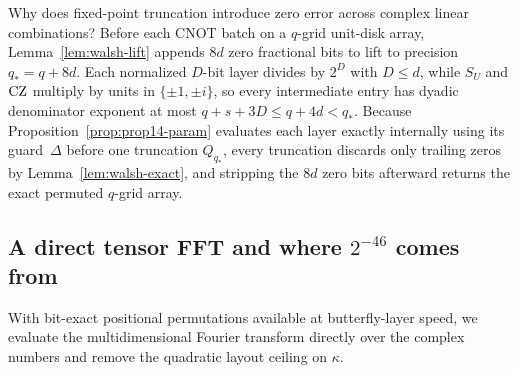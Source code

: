 Why does fixed-point truncation introduce zero error across complex linear combinations? Before each CNOT batch on a $q$-grid unit-disk array, Lemma~\ref{lem:walsh-lift} appends $8d$ zero fractional bits to lift to precision $q_*=q+8d$. Each normalized $D$-bit layer divides by $2^D$ with $D\le d$, while $S_U$ and $\mathrm{CZ}$ multiply by units in $\{\pm 1,\pm i\}$, so every intermediate entry has dyadic denominator exponent at most $q+s+3D\le q+4d < q_*$. Because Proposition~\ref{prop:prop14-param} evaluates each layer exactly internally using its guard~$\Delta$ before one truncation $Q_{q_*}$, every truncation discards only trailing zeros by Lemma~\ref{lem:walsh-exact}, and stripping the $8d$ zero bits afterward returns the exact permuted $q$-grid array.

\subsection{A direct tensor FFT and where \texorpdfstring{$2^{-46}$}{2\^{}\{-46\}} comes from}\label{sec:overview-fft}

With bit-exact positional permutations available at butterfly-layer speed, we evaluate the multidimensional Fourier transform directly over the complex numbers and remove the quadratic layout ceiling on $\kappa$.

